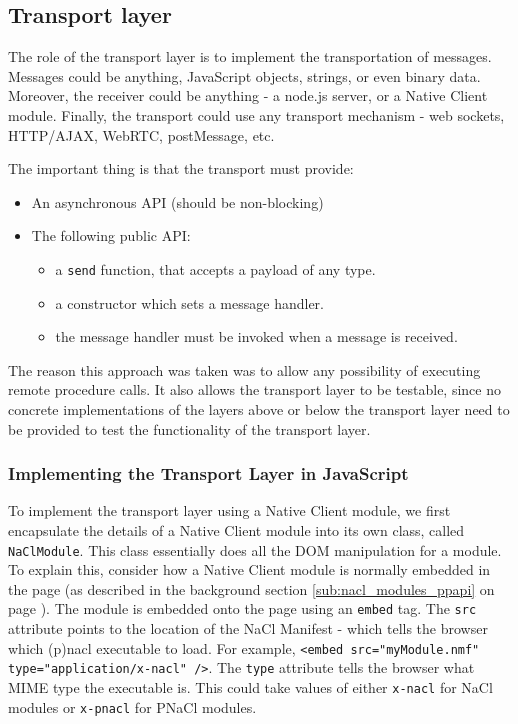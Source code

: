\subsection{Transport layer} %
\label{sub:transport_layer_design}
The role of the transport layer is to implement the transportation of messages. Messages could be anything, JavaScript objects, strings, or even binary data. Moreover, the receiver could be anything - a node.js server, or a Native Client module. Finally, the transport could use any transport mechanism - web sockets, HTTP/AJAX, WebRTC, postMessage, etc.

The important thing is that the transport must provide:
\begin{itemize}
	\item An asynchronous API (should be non-blocking)
	\item The following public API:
	\begin{itemize}
		\item a \lstinline+send+ function, that accepts a payload of any type.
		\item a constructor which sets a message handler.
		\item the message handler must be invoked when a message is received. 
	\end{itemize}
\end{itemize}

The reason this approach was taken was to allow any possibility of executing remote procedure calls. It also allows the transport layer to be testable, since no concrete implementations of the layers above or below the transport layer need to be provided to test the functionality of the transport layer.


\subsubsection{Implementing the Transport Layer in JavaScript} %
\label{ssub:implementing_the_transport_layer_in_javascript}
To implement the transport layer using a Native Client module, we first encapsulate the details of a Native Client module into its own class, called \lstinline{NaClModule}. This class essentially does all the DOM manipulation for a module. To explain this, consider how a Native Client module is normally embedded in the page (as described in the background section \ref{sub:nacl_modules_ppapi} on page \pageref{sub:nacl_modules_ppapi}). The module is embedded onto the page using an \lstinline{embed} tag. The \lstinline{src} attribute points to the location of the NaCl Manifest - which tells the browser which (p)nacl executable to load. For example, \lstinline{<embed src="myModule.nmf" type="application/x-nacl" />}. The \lstinline{type} attribute tells the browser what MIME type the executable is. This could take values of either \lstinline{x-nacl} for NaCl modules or \lstinline{x-pnacl} for PNaCl modules. 

